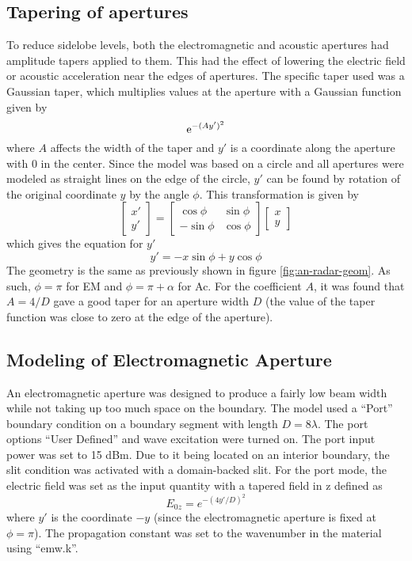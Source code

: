 \documentclass[11pt,twoside]{eitExjobb}
\begin{document}
	\subsection{Tapering of apertures}
	To reduce sidelobe levels, both the electromagnetic and acoustic apertures had amplitude tapers applied to them. \addref This had the effect of lowering the electric field or acoustic acceleration near the edges of apertures. The specific taper used was a Gaussian taper, which multiplies values at the aperture with a Gaussian function given by
	\begin{equation*}
	\mathrm{e}^{-(Ay')^2}
	\end{equation*}
	where $A$ affects the width of the taper and $y'$ is a coordinate along the aperture with 0 in the center. Since the model was based on a circle and all apertures were modeled as straight lines on the edge of the circle, $y'$ can be found by rotation of the original coordinate $y$ by the angle $\phi$. This transformation is given by \addref
	\begin{equation*}
		\begin{bmatrix}
			x' \\
			y'
		\end{bmatrix}
		=
		\begin{bmatrix}
			\cos{\phi} & \sin{\phi} \\
			-\sin{\phi} & \cos{\phi}
		\end{bmatrix}
		\begin{bmatrix}
			x \\
			y
		\end{bmatrix}
	\end{equation*}
	which gives the equation for $y'$
	\begin{equation*}
		y' = -x\sin{\phi} + y\cos{\phi}
	\end{equation*}
	The geometry is the same as previously shown in figure \ref{fig:an-radar-geom}. As such, $\phi = \pi$ for EM and $\phi = \pi + \alpha$ for Ac. For the coefficient $A$, it was found that $A = 4/D$ gave a good taper for an aperture width $D$ (the value of the taper function was close to zero at the edge of the aperture).
	
	\subsection{Modeling of Electromagnetic Aperture}
	An electromagnetic aperture was designed to produce a fairly low beam width while not taking up too much space on the boundary. The model used a ``Port'' boundary condition on a boundary segment with length $D = 8\lambda$. The port options ``User Defined'' and wave excitation were turned on. The port input power was set to 15 dBm. Due to it being located on an interior boundary, the slit condition was activated with a domain-backed slit. For the port mode, the electric field was set as the input quantity with a tapered field in z defined as
	\begin{equation*}
		E_{0z} = e^{-(4y'/D)^2}
	\end{equation*}
	where $y'$ is the coordinate $-y$ (since the electromagnetic aperture is fixed at $\phi = \pi$). The propagation constant was set to the wavenumber in the material using ``emw.k''.
	
\end{document}
